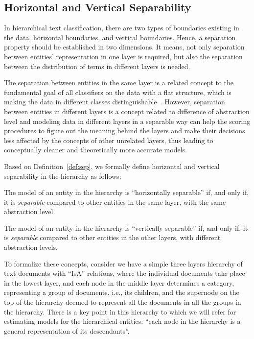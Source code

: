 \subsection{Horizontal and Vertical Separability}
\label{subsec:vhs}

In hierarchical text classification, there are two types of boundaries existing in the data, horizontal boundaries, and vertical boundaries. Hence, a separation property should be established in two dimensions. It means, not only separation between entities' representation in one layer is required, but also the separation between the distribution of terms in different layers is needed.

The separation between entities in the same layer is a related concept to the fundamental goal of all classifiers on the data with a flat structure, which is making the data in different classes distinguishable~\citep{Sebastiani:2002}. However, separation between entities in different layers is a concept related to difference of abstraction level and modeling data in different layers in a separable way can help the scoring procedures to figure out the meaning behind the layers and make their decisions less affected by the concepts of other unrelated layers, thus leading to conceptually cleaner and theoretically more accurate models.

Based on Definition~\ref{def:sep}, we formally define horizontal and vertical separability in the hierarchy as follows:
\begin{mydef}
The model of an entity in the hierarchy is ``horizontally separable'' if, and only if, it is \emph{separable} compared to other entities in the same layer, with the same abstraction level.
\end{mydef}

\begin{mydef}
The model of an entity in the hierarchy is ``vertically separable'' if, and only if, it is \emph{separable} compared to other entities in the other layers, with different abstraction levels.
\end{mydef}

To formalize these concepts, consider we have a simple three layers hierarchy of text documents with ``IsA'' relations, where the individual documents take place in the lowest layer, and each node in the middle layer determines a category, representing a group of documents, i.e., its children, and the supernode on the top of the hierarchy deemed to represent all the documents in all the groups in the hierarchy. 
%
There is a key point in this hierarchy to which we will refer for estimating models for the hierarchical entities: ``each node in the hierarchy is a general representation of its descendants''.

